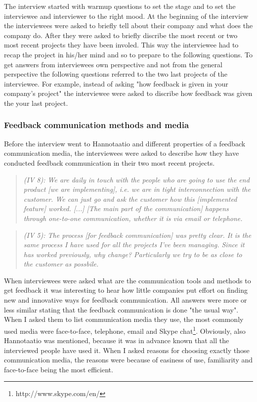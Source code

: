 \documentclass[english,12pt,a4paper,pdftex]{article}
\newcommand{\q}[2]{
\begin{quote}
\emph{(IV #1): #2}
\end{quote}}
\begin{document}
The interview started with warmup questions to set the stage and to set the interviewee and interviewer to the right mood. At the beginning of the interview the interviewees were asked to briefly tell about their company and what does the company do. After they were asked to briefly discribe the most recent or two most recent projects they have been involed. This way the interviewee had to recap the project in his/her mind and so to prepare to the following questions. To get answers from interviewees own perspective and not from the general perspective the following questions referred to the two last projects of the interviewee. For example, instead of asking "how feedback is given in your company's project" the interviewee were asked to discribe how feedback was given the your last project.

\subsubsection{Feedback communication methods and media}

Before the interview went to Hannotaatio and different properties of a feedback communication media, the interviewees were asked to describe how they have conducted feedback communication in their two most recent projects.

\q{8}{We are daily in touch with the people who are going to use the end product [we are implementing], i.e. we are in tight interconnection with the customer. We can just go and ask the customer how this [implemented feature] worked. [...] [The main part of the communication] happens through one-to-one communication, whether it is via email or telephone.}

\q{5}{The process [for feedback communication] was pretty clear. It is the same process I have used for all the projects I've been managing. Since it has worked previously, why change? Particularly we try to be as close to the customer as possbile.}

When interviewees were asked what are the communication tools and methods to get feedback it was interesting to hear how little companies put effort on finding new and innovative ways for feedback communication. All answers were more or less similar stating that the feedback communication is done "the usual way". When I asked them to list communication media they use, the most commonly used media were face-to-face, telephone, email and Skype chat\footnote{http://www.skype.com/en/}. Obviously, also Hannotaatio was mentioned, because it was in advance known that all the interviewed people have used it. When I asked reasons for choosing exactly those communication media, the reasons were because of easiness of use, familiarity and face-to-face being the most efficient. 
\end{document}
